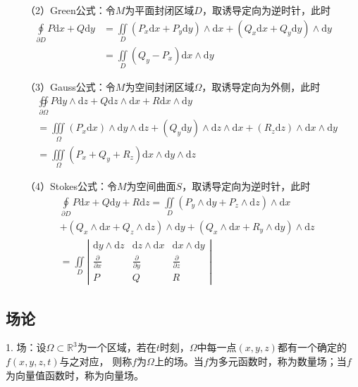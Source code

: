 ~~~~（2）Green公式：令$M$为平面封闭区域$D$，取诱导定向为逆时针，此时
\begin{align*}
    \oint\limits_{\partial D}P\mathrm{d}x+Q\mathrm{d}y &=\iint\limits_D \left(P_x\mathrm{d}x+P_y\mathrm{d}y\right)\wedge\mathrm{d}x+\left(Q_x\mathrm{d}x+Q_y\mathrm{d}y\right)\wedge\mathrm{d}y\\
&=\iint\limits_D \left(Q_y-P_x\right)\mathrm{d}x\wedge \mathrm{d}y
\end{align*}


~~~~（3）Gauss公式：令$M$为空间封闭区域$\Omega$，取诱导定向为外侧，此时
\begin{align*}
    &\oiint\limits_{\partial \Omega} P\mathrm{d} y\wedge\mathrm{d}z+Q\mathrm{d}z\wedge\mathrm{d}x+R\mathrm{d}x\wedge\mathrm{d}y\\
    &=\iiint\limits_{\Omega}\left(P_x\mathrm{d}x\right)\wedge \mathrm{d}y \wedge \mathrm{d}z+\left(Q_y\mathrm{d}y\right)\wedge \mathrm{d}z \wedge \mathrm{d}x+\left(R_z\mathrm{d}z\right)\wedge \mathrm{d}x \wedge \mathrm{d}y\\
    &=\iiint\limits_{\Omega}\left(P_x+Q_y+R_z\right)\mathrm{d}x\wedge\mathrm{d}y\wedge\mathrm{d}z
\end{align*}

~~~~（4）Stokes公式：令$M$为空间曲面$S$，取诱导定向为逆时针，此时
\begin{align*}
    &\oint\limits_{\partial D}P\mathrm{d}x+Q\mathrm{d}y+R\mathrm{d}z=\iint\limits_{D}\left(P_y\wedge \mathrm{d} y +P_z \wedge \mathrm{d} z\right)\wedge \mathrm{d}x \\
    &+\left(Q_x\wedge \mathrm{d} x +Q_z \wedge \mathrm{d} z\right)\wedge \mathrm{d}y+\left(Q_x\wedge \mathrm{d} x +R_y \wedge \mathrm{d} y\right)\wedge \mathrm{d}z\\
    &=\iint\limits_{D} \left|\begin{matrix}
        \mathrm{d}y\wedge\mathrm{d}z &\mathrm{d}z\wedge\mathrm{d}x&\mathrm{d}x\wedge\mathrm{d}y\\
        \frac{\partial }{\partial x} &\frac{\partial }{\partial y}&\frac{\partial }{\partial z}\\
        P&Q&R  
    \end{matrix}\right|
\end{align*}

\subsection{场论}

1. 场：设$\Omega\subset \mathbb{R}^3$为一个区域，若在$t$时刻，$\Omega$中每一点$(x,y,z)$都有一个确定的$f(x,y,z,t)$与之对应，
则称$f$为$\Omega$上的场。当$f$为多元函数时，称为数量场；当$f$为向量值函数时，称为向量场。

